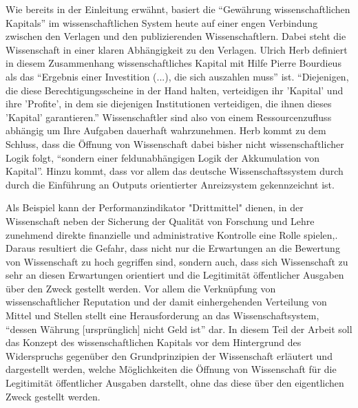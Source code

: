 Wie bereits in der Einleitung erwähnt, basiert die “Gewährung wissenschaftlichen Kapitals” im wissenschaftlichen System heute auf einer engen Verbindung zwischen den Verlagen und den publizierenden Wissenschaftlern\cite{herb_2006}. Dabei steht die Wissenschaft in einer klaren Abhängigkeit zu den Verlagen. Ulrich Herb definiert in diesem Zusammenhang wissenschaftliches Kapital mit Hilfe Pierre Bourdieus als das “Ergebnis einer Investition (...), die sich auszahlen muss” ist. “Diejenigen, die diese Berechtigungsscheine in der Hand halten, verteidigen ihr 'Kapital' und ihre 'Profite', in dem sie diejenigen Institutionen verteidigen, die ihnen dieses 'Kapital' garantieren.”\cite{Bourdieu_1992} Wissenschaftler sind also von einem Ressourcenzufluss abhängig um Ihre Aufgaben dauerhaft wahrzunehmen\cite{Suess_2006}. Herb kommt zu dem Schluss, dass die Öffnung von Wissenschaft dabei bisher nicht wissenschaftlicher Logik folgt, “sondern einer feldunabhängigen Logik der Akkumulation von Kapital”\cite{herb_2006}. Hinzu kommt, dass vor allem das deutsche Wissenschaftssystem durch durch die Einführung an Outputs orientierter Anreizsystem gekennzeichnt ist.\cite{osterloh2008anreize}

Als Beispiel kann der Performanzindikator "Drittmittel"\cite{Jansen_2007} dienen, in der Wissenschaft neben der Sicherung der Qualität von Forschung und Lehre zunehmend direkte finanzielle und administrative Kontrolle eine Rolle spielen\cite{Barl_sius_2008},. Daraus resultiert die Gefahr, dass nicht nur die Erwartungen an die Bewertung von Wissenschaft zu hoch gegriffen sind, sondern auch, dass sich Wissenschaft zu sehr an diesen Erwartungen orientiert und die Legitimität öffentlicher Ausgaben über den Zweck gestellt werden. Vor allem die Verknüpfung von wissenschaftlicher Reputation und der damit einhergehenden Verteilung von Mittel und Stellen stellt eine Herausforderung an das Wissenschaftsystem, “dessen Währung [ursprünglich] nicht Geld ist”\cite{hanekop_2006} dar. In diesem Teil der Arbeit soll das Konzept des wissenschaftlichen Kapitals vor dem Hintergrund des Widerspruchs gegenüber den Grundprinzipien der Wissenschaft erläutert und dargestellt werden, welche Möglichkeiten die Öffnung von Wissenschaft für die Legitimität öffentlicher Ausgaben darstellt, ohne das diese über den eigentlichen Zweck gestellt werden.
